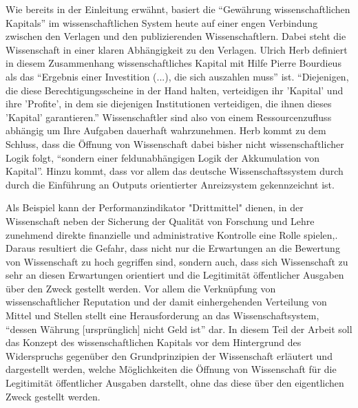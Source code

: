 Wie bereits in der Einleitung erwähnt, basiert die “Gewährung wissenschaftlichen Kapitals” im wissenschaftlichen System heute auf einer engen Verbindung zwischen den Verlagen und den publizierenden Wissenschaftlern\cite{herb_2006}. Dabei steht die Wissenschaft in einer klaren Abhängigkeit zu den Verlagen. Ulrich Herb definiert in diesem Zusammenhang wissenschaftliches Kapital mit Hilfe Pierre Bourdieus als das “Ergebnis einer Investition (...), die sich auszahlen muss” ist. “Diejenigen, die diese Berechtigungsscheine in der Hand halten, verteidigen ihr 'Kapital' und ihre 'Profite', in dem sie diejenigen Institutionen verteidigen, die ihnen dieses 'Kapital' garantieren.”\cite{Bourdieu_1992} Wissenschaftler sind also von einem Ressourcenzufluss abhängig um Ihre Aufgaben dauerhaft wahrzunehmen\cite{Suess_2006}. Herb kommt zu dem Schluss, dass die Öffnung von Wissenschaft dabei bisher nicht wissenschaftlicher Logik folgt, “sondern einer feldunabhängigen Logik der Akkumulation von Kapital”\cite{herb_2006}. Hinzu kommt, dass vor allem das deutsche Wissenschaftssystem durch durch die Einführung an Outputs orientierter Anreizsystem gekennzeichnt ist.\cite{osterloh2008anreize}

Als Beispiel kann der Performanzindikator "Drittmittel"\cite{Jansen_2007} dienen, in der Wissenschaft neben der Sicherung der Qualität von Forschung und Lehre zunehmend direkte finanzielle und administrative Kontrolle eine Rolle spielen\cite{Barl_sius_2008},. Daraus resultiert die Gefahr, dass nicht nur die Erwartungen an die Bewertung von Wissenschaft zu hoch gegriffen sind, sondern auch, dass sich Wissenschaft zu sehr an diesen Erwartungen orientiert und die Legitimität öffentlicher Ausgaben über den Zweck gestellt werden. Vor allem die Verknüpfung von wissenschaftlicher Reputation und der damit einhergehenden Verteilung von Mittel und Stellen stellt eine Herausforderung an das Wissenschaftsystem, “dessen Währung [ursprünglich] nicht Geld ist”\cite{hanekop_2006} dar. In diesem Teil der Arbeit soll das Konzept des wissenschaftlichen Kapitals vor dem Hintergrund des Widerspruchs gegenüber den Grundprinzipien der Wissenschaft erläutert und dargestellt werden, welche Möglichkeiten die Öffnung von Wissenschaft für die Legitimität öffentlicher Ausgaben darstellt, ohne das diese über den eigentlichen Zweck gestellt werden.
